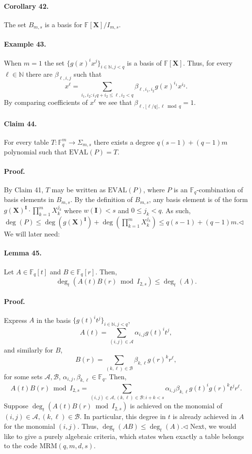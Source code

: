 \documentclass[10pt,a4paper]{article}
\begin{document}
\paragraph{Corollary 42.} The set $B_{m,s}$ is a basis for $\mathbb F[\boldsymbol X]/I_{m,s}$.
\paragraph{Example 43.} When $m=1$ the set $\{g(x)^ix^j\}_{i\in\mathbb N,j<q}$ is a basis of $\mathbb F[\boldsymbol X]$. Thus, for every $\ell\in\mathbb N$ there are $\beta_{\ell,i,j}$ such that
\[x^\ell=\sum_{i_1,i_2:i_1q+i_2\leq\ell,i_2<q}\beta_{\ell,i_1,i_2}g(x)^{i_1}x^{i_2}.\]
By comparing coefficients of $x^\ell$ we see that $\beta_{\ell,\lfloor\ell/q\rfloor,\ell\bmod q}=1$.
\paragraph{Claim 44.} For every table $T:\mathbb F_q^m\to\Sigma_{m,s}$ there exists a degree $q(s-1)+(q-1)m$ polynomial such that $\mathrm{EVAL}(P)=T$.
\paragraph{Proof.} By Claim 41, $T$ may be written as $\mathrm{EVAL}(P)$, where $P$ is an $\mathbb F_q$-combination of basis elements in $B_{m,s}$. By the definition of $B_{m,s}$, any basis element is of the form $g(\boldsymbol X)^{\boldsymbol I}\cdot\prod_{k=1}^mX_k^{j_k}$ where $w(\boldsymbol I)<s$ and $0\leq j_k<q$. As such, $\deg(P)\leq\deg(g(\boldsymbol X)^{\boldsymbol I})+\deg(\prod_{k=1}^mX_k^{j_k})\leq q(s-1)+(q-1)m$.\hfill$\triangleleft$
We will later need:
\paragraph{Lemma 45.} Let $A\in\mathbb F_q[t]$ and $B\in\mathbb F_q[r]$. Then,
\[\deg_t(A(t)B(r)\bmod I_{2,s})\leq\deg_t(A).\]
\paragraph{Proof.} Express $A$ in the basis $\{g(t)^it^j\}_{i\in\mathbb N,j<q}$,
\[A(t)=\sum_{(i,j)\in\mathcal A}\alpha_{i,j}g(t)^it^j,\]
and similarly for $B$,
\[B(r)=\sum_{(k,\ell)\in\mathcal B}\beta_{k,\ell}g(r)^kr^\ell,\]
for some sets $\mathcal A,\mathcal B$, $\alpha_{i,j},\beta_{k,\ell}\in\mathbb F_q$. Then,
\[A(t)B(r)\bmod I_{2,s}=\sum_{(i,j)\in\mathcal A,(k,\ell)\in\mathcal B:i+k<s}\alpha_{i,j}\beta_{k,\ell}g(t)^ig(r)^kt^jr^\ell.\]
Suppose $\deg_t(A(t)B(r)\bmod I_{2,s})$ is achieved on the monomial of $(i,j)\in\mathcal A,(k,\ell)\in\mathcal B$. In particular, this degree in $t$ is already achieved in $A$ for the monomial $(i,j)$. Thus, $\deg_t(AB)\leq\deg_t(A)$.\hfill$\triangleleft$
Next, we would like to give a purely algebraic criteria, which states when exactly a table belongs to the code $\mathrm{MRM}(q,m,d,s)$.
\end{document}
